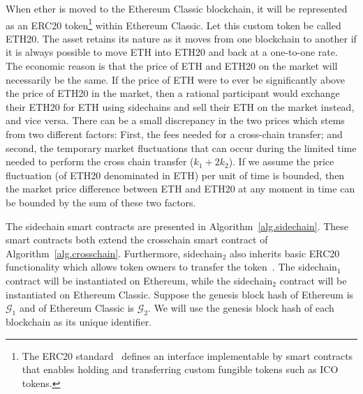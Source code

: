 When ether is moved to the Ethereum Classic blockchain, it will be represented
as an ERC20 token\footnote{The ERC20 standard~\cite{erc20} defines an interface
implementable by smart contracts that enables holding and transferring custom
fungible tokens such as ICO tokens.} within Ethereum Classic. Let this custom
token be called ETH20. The asset retains its nature as it moves from one
blockchain to another if it is always possible to move ETH into ETH20 and back
at a one-to-one rate. The economic reason is that the price of ETH and ETH20 on
the market will necessarily be the same. If the price of ETH were to ever be
significantly above the price of ETH20 in the market, then a rational
participant would exchange their ETH20 for ETH using sidechains and sell their
ETH on the market instead, and vice versa. There can be a small discrepancy in
the two prices which stems from two different factors: First, the fees needed
for a cross-chain transfer; and second, the temporary market fluctuations that
can occur during the limited time needed to perform the cross chain transfer
($k_1 + 2k_2$). If we assume the price fluctuation (of ETH20 denominated in ETH)
per unit of time is bounded, then the market price difference between ETH and
ETH20 at any moment in time can be bounded by the sum of these two factors.

The sidechain smart contracts are presented in Algorithm~\ref{alg.sidechain}.
These smart contracts both extend the \textsf{crosschain} smart contract of
Algorithm~\ref{alg.crosschain}. Furthermore, \textsf{sidechain}$_2$ also
inherits basic \textsf{ERC20} functionality which allows token owners to
transfer the token~\cite{openzeppelin-erc20}. The \textsf{sidechain}$_1$
contract will be instantiated on Ethereum, while the \textsf{sidechain}$_2$
contract will be instantiated on Ethereum Classic. Suppose the genesis block
hash of Ethereum is $\mathcal{G}_1$ and of Ethereum Classic is $\mathcal{G}_2$.
We will use the genesis block hash of each blockchain as its unique identifier.

